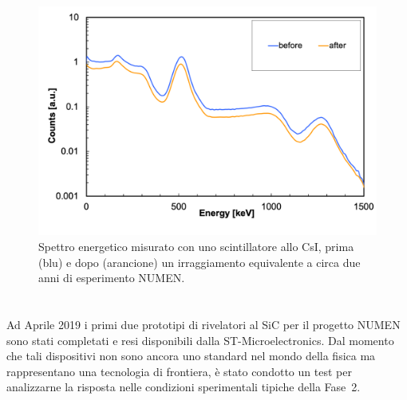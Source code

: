 \begin{figure} [!p]
	\centering
	\includegraphics[width=\textwidth, keepaspectratio]{Grafici/spettro_csi.png}
	\caption{Spettro energetico misurato con uno scintillatore allo CsI, prima (blu) e dopo (arancione) un irraggiamento equivalente a circa due anni di esperimento NUMEN.} \label{fig:spettro_csi}
\end{figure}






\section{}

Ad Aprile 2019 i primi due prototipi di rivelatori al SiC per il progetto NUMEN sono stati completati e resi disponibili dalla ST-Microelectronics. Dal momento che tali dispositivi non sono ancora uno standard nel mondo della fisica ma rappresentano una tecnologia di frontiera, è stato condotto un test per analizzarne la risposta nelle condizioni sperimentali tipiche della Fase~2.

